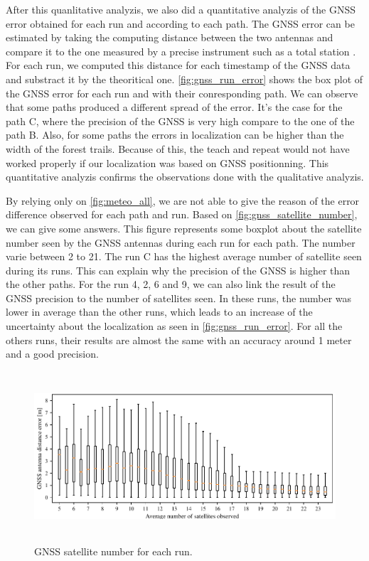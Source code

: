 After this quanlitative analyzis, we also did a quantitative analyzis of the \ac{GNSS} error obtained for each run and according to each path.
The \ac{GNSS} error can be estimated by taking the computing distance between the two antennas and compare it to the one measured by a precise instrument such as a total station \citep{Vaidis2021}.
For each run, we computed this distance for each timestamp of the \ac{GNSS} data and substract it by the theoritical one.
\autoref{fig:gnss_run_error} shows the box plot of the \ac{GNSS} error for each run and with their conresponding path.
We can observe that some paths produced a different spread of the error.
It's the case for the path C, where the precision of the \ac{GNSS} is very high compare to the one of the path B.
Also, for some paths the errors in localization can be higher than the width of the forest trails.
Because of this, the teach and repeat would not have worked properly if our localization was based on \ac{GNSS} positionning.
This quantitative analyzis confirms the observations done with the qualitative analyzis.

By relying only on \autoref{fig:meteo_all}, we are not able to give the reason of the error difference observed for each path and run.
Based on \autoref{fig:gnss_satellite_number}, we can give some answers.
This figure represents some boxplot about the satellite number seen by the \ac{GNSS} antennas during each run for each path.
The number varie between 2 to 21.
The run C has the highest average number of satellite seen during its runs.
This can explain why the precision of the \ac{GNSS} is higher than the other paths.
For the run 4, 2, 6 and 9, we can also link the result of the \ac{GNSS} precision to the number of satellites seen.
In these runs, the number was lower in average than the other runs, which leads to an increase of the uncertainty about the localization as seen in \autoref{fig:gnss_run_error}.
For all the others runs, their results are almost the same with an accuracy around 1 meter and a good precision.



\begin{figure} [htpb]
	\centering
	\includegraphics[height=2.5in]{./figs/GPS/GNSS_numsatvserr.pdf}
	\caption{GNSS satellite number for each run.}
	\label{fig:gnss_satellite_number}
\end{figure}

